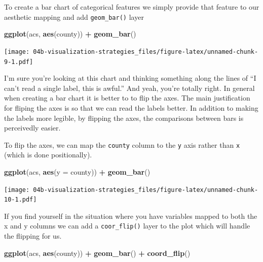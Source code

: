 \documentclass[
]{book}
\newenvironment{Shaded}{\begin{snugshade}}{\end{snugshade}}
\newcommand{\DataTypeTok}[1]{\textcolor[rgb]{0.13,0.29,0.53}{#1}}
\newcommand{\KeywordTok}[1]{\textcolor[rgb]{0.13,0.29,0.53}{\textbf{#1}}}
\newcommand{\NormalTok}[1]{#1}
\newcommand{\OperatorTok}[1]{\textcolor[rgb]{0.81,0.36,0.00}{\textbf{#1}}}
\newcommand{\StringTok}[1]{\textcolor[rgb]{0.31,0.60,0.02}{#1}}
\begin{document}
To create a bar chart of categorical features we simply provide that feature to our aesthetic mapping and add \texttt{geom\_bar()} layer

\begin{Shaded}
\begin{Highlighting}[]
\KeywordTok{ggplot}\NormalTok{(acs, }\KeywordTok{aes}\NormalTok{(county)) }\OperatorTok{+}
\StringTok{  }\KeywordTok{geom\_bar}\NormalTok{()}
\end{Highlighting}
\end{Shaded}

\texttt{[image: 04b-visualization-strategies\_files/figure-latex/unnamed-chunk-9-1.pdf]}

I'm sure you're looking at this chart and thinking something along the lines of ``I can't read a single label, this is awful.'' And yeah, you're totally right. In general when creating a bar chart it is better to to flip the axes. The main justification for fliping the axes is so that we can read the labels better. In addition to making the labels more legible, by flipping the axes, the comparisons between bars is perceivedly easier.

To flip the axes, we can map the \texttt{county} column to the \texttt{y} axis rather than \texttt{x} (which is done positionally).

\begin{Shaded}
\begin{Highlighting}[]
\KeywordTok{ggplot}\NormalTok{(acs, }\KeywordTok{aes}\NormalTok{(}\DataTypeTok{y =}\NormalTok{ county)) }\OperatorTok{+}
\StringTok{  }\KeywordTok{geom\_bar}\NormalTok{()}
\end{Highlighting}
\end{Shaded}

\texttt{[image: 04b-visualization-strategies\_files/figure-latex/unnamed-chunk-10-1.pdf]}

If you find yourself in the situation where you have variables mapped to both the x and y columns we can add a \texttt{coor\_flip()} layer to the plot which will handle the flipping for us.

\begin{Shaded}
\begin{Highlighting}[]
\KeywordTok{ggplot}\NormalTok{(acs, }\KeywordTok{aes}\NormalTok{(county)) }\OperatorTok{+}
\StringTok{  }\KeywordTok{geom\_bar}\NormalTok{() }\OperatorTok{+}
\StringTok{  }\KeywordTok{coord\_flip}\NormalTok{()}
\end{Highlighting}
\end{Shaded}
\end{document}
